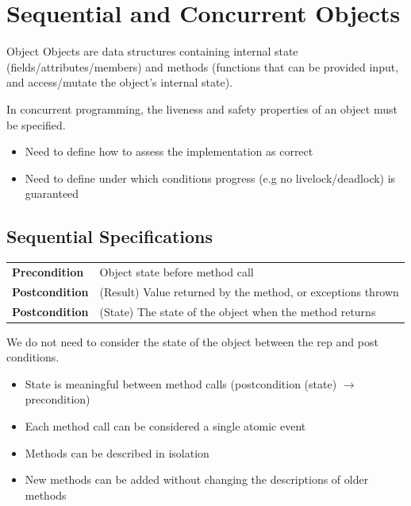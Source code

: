 \unfinished

\section{Sequential and Concurrent Objects}
\begin{definitionbox}{Object}
	Objects are data structures containing internal state (fields/attributes/members) and methods (functions that can be provided input, and access/mutate the object's internal state).
\end{definitionbox}
In concurrent programming, the liveness and safety properties of an object must be specified.
\begin{itemize}
	\item Need to define how to assess the implementation as correct
	\item Need to define under which conditions progress (e.g no livelock/deadlock) is guaranteed
\end{itemize}

\subsection{Sequential Specifications}
\begin{center}
	\begin{tabular}{l p{}}
		\textbf{Precondition}  & Object state before method call                             \\
		\textbf{Postcondition} & (Result) Value returned by the method, or exceptions thrown \\
		\textbf{Postcondition} & (State)  The state of the object when the method returns    \\
	\end{tabular}
\end{center}
We do not need to consider the state of the object between the rep and post conditions.
\begin{itemize}
	\item State is meaningful between method calls (postcondition (state) $\to$ precondition)
	\item Each method call can be considered a single atomic event
	\item Methods can be described in isolation
	\item New methods can be added without changing the descriptions of older methods
\end{itemize}

